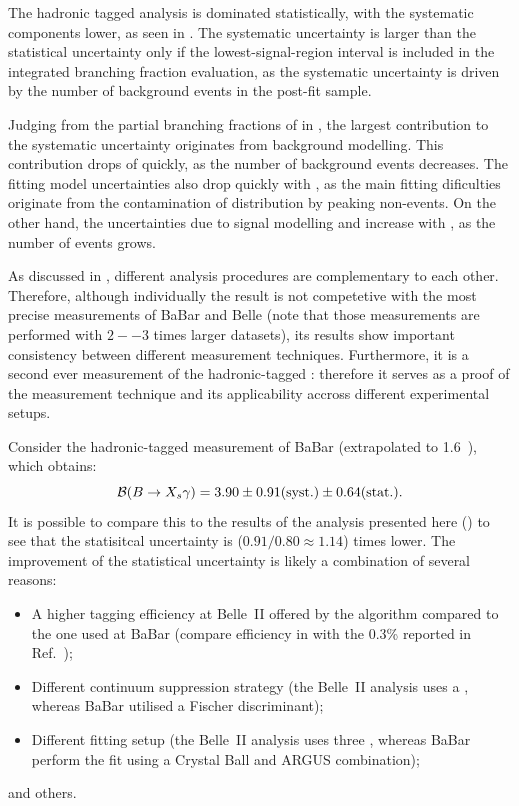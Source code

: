 The hadronic tagged \BtoXsgamma analysis is dominated statistically, with the systematic components lower, as seen in .
The systematic uncertainty is larger than the statistical uncertainty only if the lowest-\EB signal-region interval is included in the integrated branching fraction evaluation, 
as the systematic uncertainty is driven by the number of background events in the post-fit sample.

Judging from the partial branching fractions of \BtoXsgamma in ,
the largest contribution to the systematic uncertainty originates from background modelling.
This contribution drops of quickly, as the number of background events decreases.
The \Mbc fitting model uncertainties also drop quickly with \EB, as the main fitting dificulties originate from the contamination of \Mbc distribution by peaking non-\BtoXsgamma events.
On the other hand, the uncertainties due to signal modelling and \BtoXdgamma increase with \EB, as the number of \BtoXsdgamma events grows.

As discussed in , different analysis procedures are complementary to each other.
Therefore, although individually the result is not competetive with the most precise measurements of BaBar and Belle (note that those measurements are performed with $2--3$ times larger datasets),
its results show important consistency between different measurement techniques.
Furthermore, it is a second ever measurement of the hadronic-tagged \BtoXsgamma: therefore it serves as a proof of the measurement technique and its applicability accross different experimental setups.

Consider the hadronic-tagged measurement of BaBar \cite{BaBar:2007yhb} (extrapolated to 1.6~\gev), which obtains:
\begin{equation}\label{eq:babar_measurement}
    \mathcal{B}(\BtoXsgamma) = 3.90 \pm 0.91 \mathrm{(syst.)} \pm 0.64 \mathrm{(stat.)}.
\end{equation}
It is possible to compare this to the results of the analysis presented here ()
to see that the statisitcal uncertainty is ($0.91/0.80\approx1.14$) times lower.
The improvement of the statistical uncertainty is likely a combination of several reasons:
\begin{itemize}
    \item A higher tagging efficiency at Belle~II offered by the \FEI algorithm compared to the one used at BaBar (compare \FEI efficiency in  with the 0.3\% reported in Ref.~\cite{BaBar:2007yhb});
    \item Different continuum suppression strategy (the Belle~II analysis uses a \BDT, whereas BaBar utilised a Fischer discriminant);
    \item Different fitting setup (the Belle~II analysis uses three , whereas BaBar perform the fit using a Crystal Ball and ARGUS \PDF combination);
\end{itemize}
and others.

